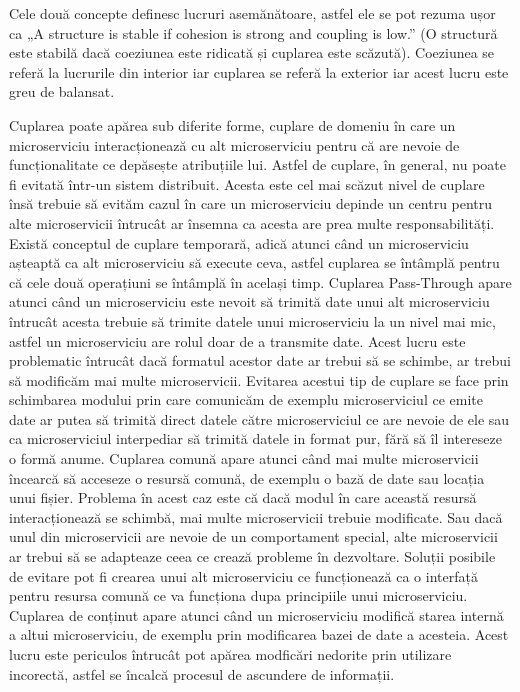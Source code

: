 Cele două concepte definesc lucruri asemănătoare, astfel ele se pot rezuma ușor ca „A structure is stable if cohesion is strong and coupling is low.” \cite{endres_rombach_2003} 
(O structură este stabilă dacă coeziunea este ridicată și cuplarea este scăzută). Coeziunea se referă la lucrurile
din interior iar cuplarea se referă la exterior iar acest lucru este greu de balansat.

Cuplarea poate apărea sub diferite forme, cuplare de domeniu în care un microserviciu interacționează
cu alt microserviciu pentru că are nevoie de funcționalitate ce depăsește atribuțiile lui. Astfel de 
cuplare, în general, nu poate fi evitată într-un sistem distribuit. Acesta este cel mai scăzut nivel
de cuplare însă trebuie să evităm cazul în care un microserviciu depinde un centru pentru alte microservicii
întrucât ar însemna ca acesta are prea multe responsabilități. Există conceptul de cuplare temporară, adică
atunci când un microserviciu așteaptă ca alt microserviciu să execute ceva, astfel cuplarea se întâmplă pentru că cele
două operațiuni se întâmplă în același timp. Cuplarea Pass-Through apare atunci când un microserviciu este nevoit
să trimită date unui alt microserviciu întrucât acesta trebuie să trimite datele 
unui microserviciu la un nivel mai mic, astfel un microserviciu are rolul doar de a transmite date. Acest lucru
este problematic întrucât dacă formatul acestor date ar trebui să se schimbe, ar trebui să
modificăm mai multe microservicii. Evitarea acestui tip de cuplare se face prin schimbarea modului
prin care comunicăm de exemplu microserviciul ce emite date ar putea să trimită direct datele către microserviciul ce are
nevoie de ele sau ca microserviciul interpediar să trimită datele in format pur, fără să îl intereseze o formă anume.
Cuplarea comună apare atunci când mai multe microservicii încearcă să acceseze o resursă 
comună, de exemplu o bază de date sau locația unui fișier. Problema în acest caz este că dacă modul în care
această resursă interacționează se schimbă, mai multe microservicii trebuie modificate. Sau dacă
unul din microservicii are nevoie de un comportament special, alte microservicii ar trebui să 
se adapteaze ceea ce crează probleme în dezvoltare. Soluții posibile de evitare pot fi crearea unui alt 
microserviciu ce funcționează ca o interfață pentru resursa comună ce va funcționa dupa principiile unui
microserviciu. Cuplarea de conținut apare atunci când un microserviciu modifică starea internă a altui 
microserviciu, de exemplu prin modificarea bazei de date a acesteia. Acest lucru este periculos întrucât pot
apărea modficări nedorite prin utilizare incorectă, astfel se încalcă procesul de ascundere de informații.

